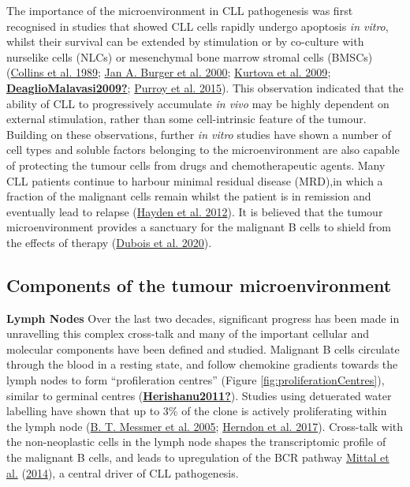 \documentclass[11pt, a4paper, twosided]{book}
\begin{document}
The importance of the microenvironment in CLL pathogenesis was first recognised in studies that showed CLL cells rapidly undergo apoptosis \emph{in vitro}, whilst their survival can be extended by stimulation or by co-culture with nurselike cells (NLCs) or mesenchymal bone marrow stromal cells (BMSCs) (\protect\hyperlink{ref-Collins1989}{Collins et al. 1989}; \protect\hyperlink{ref-Burger2000}{Jan A. Burger et al. 2000}; \protect\hyperlink{ref-Kurtova2009}{Kurtova et al. 2009}; \protect\hyperlink{ref-DeaglioMalavasi2009}{\textbf{DeaglioMalavasi2009?}}; \protect\hyperlink{ref-Purroy2015}{Purroy et al. 2015}). This observation indicated that the ability of CLL to progressively accumulate \emph{in vivo} may be highly dependent on external stimulation, rather than some cell-intrinsic feature of the tumour. Building on these observations, further \emph{in vitro} studies have shown a number of cell types and soluble factors belonging to the microenvironment are also capable of protecting the tumour cells from drugs and chemotherapeutic agents. Many CLL patients continue to harbour minimal residual disease (MRD),in which a fraction of the malignant cells remain whilst the patient is in remission and eventually lead to relapse (\protect\hyperlink{ref-Hayden2012}{Hayden et al. 2012}). It is believed that the tumour microenvironment provides a sanctuary for the malignant B cells to shield from the effects of therapy (\protect\hyperlink{ref-Dubois2020}{Dubois et al. 2020}).

\hypertarget{components-of-the-tumour-microenvironment}{%
\subsection{Components of the tumour microenvironment}\label{components-of-the-tumour-microenvironment}}

\textbf{Lymph Nodes}
Over the last two decades, significant progress has been made in unravelling this complex cross-talk and many of the important cellular and molecular components have been defined and studied. Malignant B cells circulate through the blood in a resting state, and follow chemokine gradients towards the lymph nodes to form ``profileration centres'' (Figure \ref{fig:proliferationCentres}), similar to germinal centres (\protect\hyperlink{ref-Herishanu2011}{\textbf{Herishanu2011?}}). Studies using detuerated water labelling have shown that up to 3\% of the clone is actively proliferating within the lymph node (\protect\hyperlink{ref-Messmer2005}{B. T. Messmer et al. 2005}; \protect\hyperlink{ref-Herndon2017}{Herndon et al. 2017}). Cross-talk with the non-neoplastic cells in the lymph node shapes the transcriptomic profile of the malignant B cells, and leads to upregulation of the BCR pathway \protect\hyperlink{ref-Mittal2014}{Mittal et al.} (\protect\hyperlink{ref-Mittal2014}{2014}), a central driver of CLL pathogenesis.
\end{document}
